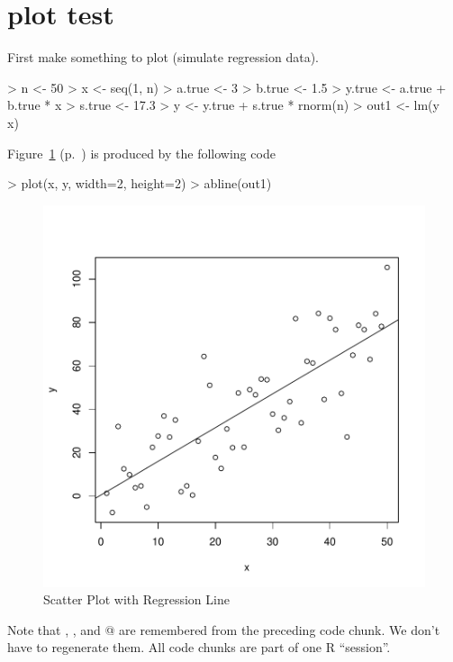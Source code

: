 \documentclass{article}
\begin{document}
\section*{plot test}

First make something to plot
(simulate regression data).
\begin{Schunk}
\begin{Sinput}
> n <- 50
> x <- seq(1, n)
> a.true <- 3
> b.true <- 1.5
> y.true <- a.true + b.true * x
> s.true <- 17.3
> y <- y.true + s.true * rnorm(n)
> out1 <- lm(y ~ x)
\end{Sinput}
\end{Schunk}


Figure~\ref{fig:one} (p.~\pageref{fig:one})
is produced by the following code
\begin{Schunk}
\begin{Sinput}
> plot(x, y, width=2, height=2)
> abline(out1)
\end{Sinput}
\end{Schunk}

\begin{figure}[!h]
  \centering
\includegraphics{plot_test-fig1}

\caption{Scatter Plot with Regression Line}
\label{fig:one}
\end{figure}
Note that \verb@x@, \verb@y@, and @ are remembered from
the preceding code chunk.  We don't have to regenerate them.
All code chunks are part of one R ``session''.
\end{document}
